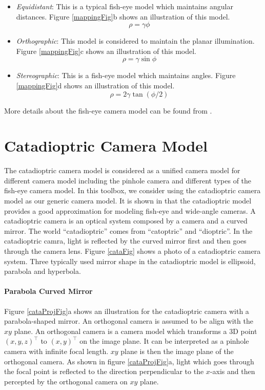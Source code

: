 \documentclass{report}
\begin{document}
\begin{itemize}
\item \textit{Equidistant}: This is a typical fish-eye model which maintains angular distances. Figure \ref{mappingFig}b shows an illustration of this model. 
\begin{equation}
\rho = \gamma \phi
\end{equation}
\item \textit{Orthographic}: This model is considered to maintain the planar illumination. Figure \ref{mappingFig}c shows an illustration of this model. 
\begin{equation}
\rho = \gamma \sin \phi
\end{equation}
\item \textit{Stereographic}: This is a fish-eye model which maintains angles. Figure \ref{mappingFig}d shows an illustration of this model. 
\begin{equation}
\rho = 2 \gamma \tan(\phi / 2)
\label{stereographicEqn}
\end{equation}
\end{itemize}
More details about the fish-eye camera model can be found from \cite{hughes2010accuracy}. 

\section{Catadioptric Camera Model}
The catadioptric camera model is considered as a unified camera model for different camera model including the pinhole camera and different types of the fish-eye camera model. 
In this toolbox, we consider using the catadioptric camera model as our generic camera model. It is shown in \cite{ying2004can} that the catadioptric model provides a good approximation for modeling fish-eye and wide-angle cameras. A catadioptric camera is an optical system composed by a camera and a curved mirror. The world ``catadioptric'' comes from ``catoptric'' and ``dioptric''. In the catadioptric camra, light is reflected by the curved mirror first and then goes through the camera lens. Figure \ref{cataFig} shows a photo of a catadioptric camera system. Three typically used mirror shape in the catadioptric model is ellipsoid, parabola and hyperbola. 
\paragraph{Parabola Curved Mirror} Figure \ref{cataProjFig}a shows an illustration for the catadioptric camera with a parabola-shaped mirror. An orthogonal camera is assumed to be align with the $xy$ plane. An orthogonal camera is a camera model which transforms a 3D point $(x, y, z)^\top$ to $(x, y)^\top$ on the image plane. It can be interpreted as a pinhole camera with infinite focal length. $xy$ plane is then the image plane of the orthogonal camera. As shown in figure \ref{cataProjFig}a, light which goes through the focal point is reflected to the direction perpendicular to the $x$-axis and then percepted by the orthogonal camera on $xy$ plane. 
\end{document}

